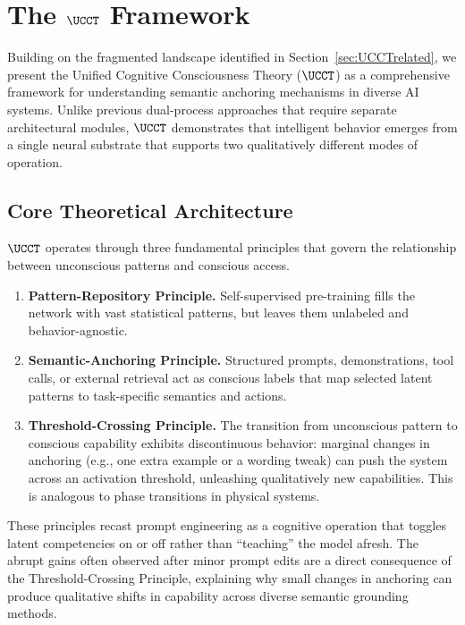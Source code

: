
\newtheorem{theorem}{Theorem}
\section{The $\UCCT$ Framework}
\label{sec:UCCT_framework}

Building on the fragmented landscape identified in Section~\ref{sec:UCCTrelated}, we present the Unified Cognitive Consciousness Theory ($\UCCT$) as a comprehensive framework for understanding semantic anchoring mechanisms in diverse AI systems. Unlike previous dual-process approaches that require separate architectural modules, $\UCCT$ demonstrates that intelligent behavior emerges from a single neural substrate that supports two qualitatively different modes of operation.

\subsection{Core Theoretical Architecture}
\label{sec:UCCT_core_architecture}

$\UCCT$ operates through three fundamental principles that govern the relationship between unconscious patterns and conscious access.

\begin{enumerate}[leftmargin=1.4em,itemsep=0pt]
\item \textbf{Pattern-Repository Principle.} Self-supervised pre-training fills the network with vast statistical patterns, but leaves them unlabeled and behavior-agnostic.

\item \textbf{Semantic-Anchoring Principle.} Structured prompts, demonstrations, tool calls, or external retrieval act as conscious labels that map selected latent patterns to task-specific semantics and actions.

\item \textbf{Threshold-Crossing Principle.} The transition from unconscious pattern to conscious capability exhibits discontinuous behavior: marginal changes in anchoring (e.g., one extra example or a wording tweak) can push the system across an activation threshold, unleashing qualitatively new capabilities. This is analogous to phase transitions in physical systems.
\end{enumerate}

These principles recast prompt engineering as a cognitive operation that toggles latent competencies on or off rather than ``teaching'' the model afresh. The abrupt gains often observed after minor prompt edits are a direct consequence of the Threshold-Crossing Principle, explaining why small changes in anchoring can produce qualitative shifts in capability across diverse semantic grounding methods.


